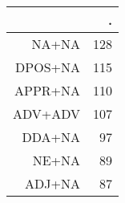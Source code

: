 \begin{tabular}{rr}
  \hline
 & . \\ 
  \hline
NA+NA & 128 \\ 
  DPOS+NA & 115 \\ 
  APPR+NA & 110 \\ 
  ADV+ADV & 107 \\ 
  DDA+NA &  97 \\ 
  NE+NA &  89 \\ 
  ADJ+NA &  87 \\ 
   \hline
\end{tabular}
